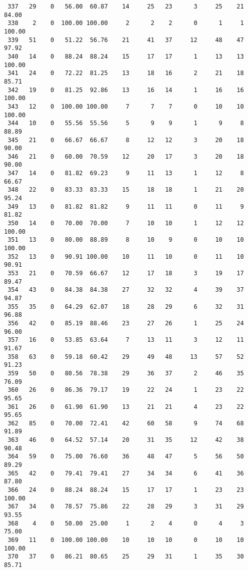 \begin{verbatim}
 337   29    0   56.00  60.87    14     25   23      3     25    21    84.00
 338    2    0  100.00 100.00     2      2    2      0      1     1   100.00
 339   51    0   51.22  56.76    21     41   37     12     48    47    97.92
 340   14    0   88.24  88.24    15     17   17      1     13    13   100.00
 341   24    0   72.22  81.25    13     18   16      2     21    18    85.71
 342   19    0   81.25  92.86    13     16   14      1     16    16   100.00
 343   12    0  100.00 100.00     7      7    7      0     10    10   100.00
 344   10    0   55.56  55.56     5      9    9      1      9     8    88.89
 345   21    0   66.67  66.67     8     12   12      3     20    18    90.00
 346   21    0   60.00  70.59    12     20   17      3     20    18    90.00
 347   14    0   81.82  69.23     9     11   13      1     12     8    66.67
 348   22    0   83.33  83.33    15     18   18      1     21    20    95.24
 349   13    0   81.82  81.82     9     11   11      0     11     9    81.82
 350   14    0   70.00  70.00     7     10   10      1     12    12   100.00
 351   13    0   80.00  88.89     8     10    9      0     10    10   100.00
 352   13    0   90.91 100.00    10     11   10      0     11    10    90.91
 353   21    0   70.59  66.67    12     17   18      3     19    17    89.47
 354   43    0   84.38  84.38    27     32   32      4     39    37    94.87
 355   35    0   64.29  62.07    18     28   29      6     32    31    96.88
 356   42    0   85.19  88.46    23     27   26      1     25    24    96.00
 357   16    0   53.85  63.64     7     13   11      3     12    11    91.67
 358   63    0   59.18  60.42    29     49   48     13     57    52    91.23
 359   50    0   80.56  78.38    29     36   37      2     46    35    76.09
 360   26    0   86.36  79.17    19     22   24      1     23    22    95.65
 361   26    0   61.90  61.90    13     21   21      4     23    22    95.65
 362   85    0   70.00  72.41    42     60   58      9     74    68    91.89
 363   46    0   64.52  57.14    20     31   35     12     42    38    90.48
 364   59    0   75.00  76.60    36     48   47      5     56    50    89.29
 365   42    0   79.41  79.41    27     34   34      6     41    36    87.80
 366   24    0   88.24  88.24    15     17   17      1     23    23   100.00
 367   34    0   78.57  75.86    22     28   29      3     31    29    93.55
 368    4    0   50.00  25.00     1      2    4      0      4     3    75.00
 369   11    0  100.00 100.00    10     10   10      0     10    10   100.00
 370   37    0   86.21  80.65    25     29   31      1     35    30    85.71

\end{verbatim}
